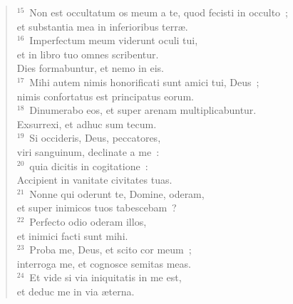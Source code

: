 \begin{flushleft}
\begin{verse}
${}^{15}$~Non est occultatum os meum a te, quod fecisti in occulto~;\\ et substantia mea in inferioribus terr\ae .\\
${}^{16}$~Imperfectum meum viderunt oculi tui,\\ et in libro tuo omnes scribentur.\\ Dies formabuntur, et nemo in eis.\\
${}^{17}$~Mihi autem nimis honorificati sunt amici tui, Deus~;\\ nimis confortatus est principatus eorum.\\
${}^{18}$~Dinumerabo eos, et super arenam multiplicabuntur.\\ Exsurrexi, et adhuc sum tecum.\\
${}^{19}$~Si occideris, Deus, peccatores,\\ viri sanguinum, declinate a me~:\\
${}^{20}$~quia dicitis in cogitatione~:\\ Accipient in vanitate civitates tuas.\\
${}^{21}$~Nonne qui oderunt te, Domine, oderam,\\ et super inimicos tuos tabescebam~?\\
${}^{22}$~Perfecto odio oderam illos,\\ et inimici facti sunt mihi.\\
${}^{23}$~Proba me, Deus, et scito cor meum~;\\ interroga me, et cognosce semitas meas.\\
${}^{24}$~Et vide si via iniquitatis in me est,\\ et deduc me in via \ae terna.\end{verse}\end{flushleft}



